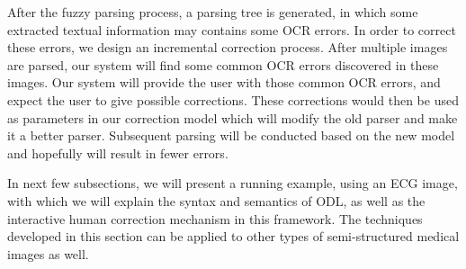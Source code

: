 After the fuzzy parsing process, a parsing tree is generated, in which some extracted textual 
information may contains some OCR errors. In order to correct these errors, we design an 
incremental correction process. 
After multiple images are parsed, our system will find some common OCR errors 
discovered in these images.  
Our system will provide the user with those common OCR errors, and expect 
the user to give possible corrections. 
These corrections would then be used as parameters in our correction model 
which will modify the old parser and make it a better parser.
Subsequent parsing will be conducted based on the new model and 
hopefully will result in fewer errors.





In next few subsections, we will present a running example, using
an ECG image, with
which we will explain the syntax and semantics of ODL, 
as well as the interactive human correction mechanism in this framework.
The techniques developed in this section can be applied to 
other types of semi-structured medical images as well.


